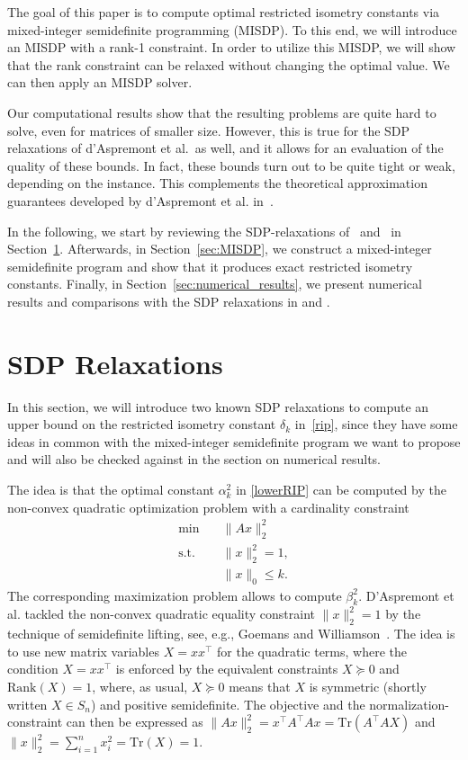 \documentclass[journal]{IEEEtran}
\newcommand{\Norm}[2]{\lVert{#1}\rVert_{#2}}
\newcommand{\T}{^{\top}}
\newcommand{\Tr}{\text{Tr}}
\newcommand{\Rk}{\text{Rank}}
\begin{document}
The goal of this paper is to compute optimal restricted isometry constants
via mixed-integer semidefinite programming (MISDP). To this end, we will
introduce an MISDP with a rank-1 constraint. In order to utilize this
MISDP, we will show that the rank constraint can be relaxed without
changing the optimal value. We can then apply an MISDP solver.

Our computational results show that the resulting problems are quite
hard to solve, even for matrices of smaller size. However, this is true for
the SDP relaxations of d'Aspremont et al.\ as well, and it allows for an
evaluation of the quality of these bounds.  In fact, these bounds turn out
to be quite tight or weak, depending on the instance. This complements the
theoretical approximation guarantees developed by d'Aspremont et
al. in~\cite{AspBG14}.

In the following, we start by reviewing the SDP-relaxations of~\cite{Asp08}
and~\cite{Asp07} in Section~\ref{sec:SDPrelax}.  Afterwards, in
Section~\ref{sec:MISDP}, we construct a mixed-integer semidefinite
program and show that it produces exact restricted isometry
constants. Finally, in Section~\ref{sec:numerical_results}, we present
numerical results and comparisons with the SDP relaxations in \cite{Asp08}
and \cite{Asp07}.


\section{SDP Relaxations}
\label{sec:SDPrelax}

\noindent
In this section, we will introduce two known SDP relaxations to compute an upper bound on the restricted isometry constant $\delta_k$ in~\eqref{rip}, since they have some ideas in common with the mixed-integer semidefinite program we want to 
propose and will also be checked against in the section on numerical
results.

The idea is that the optimal constant $\alpha_k^2$ in \eqref{lowerRIP} can be computed
by the non-convex quadratic optimization problem with a cardinality constraint
\begin{equation}\label{QP}\tag{QP}
 \begin{aligned}
  \min \quad & \Norm{Ax}{2}^2  \\
  \text{s.t.} \quad & \Norm{x}{2}^2 = 1,  \\
  & \Norm{x}{0} \leq k. 
 \end{aligned}
\end{equation}
The corresponding maximization problem allows to compute $\beta_k^2$. D'Aspremont et al. \cite{Asp07} tackled the non-convex quadratic equality constraint 
$\Norm{x}{2}^2 = 1$ by the technique of semidefinite lifting, see, e.g., Goemans and Williamson~\cite{GW95}.
The idea is to use new matrix variables $X=xx\T$ for the quadratic terms, where the condition $X=xx\T$ is enforced by the equivalent constraints $X \succeq 0$ and $\Rk(X) = 1$, where, as usual, 
$X \succeq 0$ means that $X$ is symmetric (shortly written $X \in S_n$) and positive semidefinite. The objective and the normalization-constraint can then be expressed as  $\Norm{Ax}{2}^2 = x\T A\T Ax =
\Tr(A\T A X)$ and $\Norm{x}{2}^2 = \sum_{i=1}^n x_i^2 = \Tr(X) = 1$.
\end{document}
